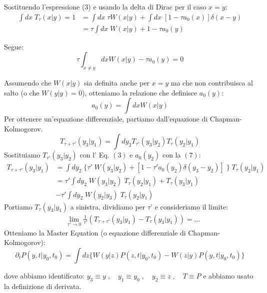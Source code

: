 Sostituendo l'espressione (3) e usando la delta di Dirac per il caso $x=y$:
\begin{align}
\int dx \;T_{\tau}(x|y) = 1 &= \int dx \; \tau W(x|y) + \int dx \; [ 1 - \tau a_0(x) ] \delta(x-y) \nonumber \\ &= \tau  \int dx \; W(x|y) + 1 - \tau a_0(y)
\end{align}

Segue:
\begin{equation}
\tau \int_{x \neq y} dx W(x|y)  - \tau a_0(y) = 0
\end{equation}


Assumendo che $W(x|y)$ sia definita anche per $x=y$ ma che non contribuisca al salto (o che $W(y|y)=0$), otteniamo la relazione che definisce $a_0(y)$:
\begin{equation}
a_0(y) = \int dx W(x|y)  
\end{equation}
Per ottenere un'equazione differenziale, partiamo dall'equazione di Chapman-Kolmogorov. 
\begin{equation}
T_{\tau+ \tau'}(y_3|y_1) = \int dy_2 T_{ \tau'}(y_3|y_2) T_{ \tau}(y_2|y_1)  
\end{equation}
Sostituiamo $T_{ \tau'}(y_3|y_2)$ con l’ Eq. $(3)$ e $a_0(y_2)$ con la $(7)$:
\begin{align*}
T_{\tau+ \tau'}(y_3|y_1) &= \int dy_2 \; \{ \tau'   \; W(y_3|y_2) + \left[1 - \tau' a_0(y_2) \delta(y_3 -y_2) \right] \;  \} \;T_{ \tau}(y_2|y_1)  \nonumber \\ &= \tau' \int dy_2 \;  W(y_3|y_2) \; T_{ \tau}(y_2|y_1)  + T_{ \tau}(y_3|y_1) \nonumber \\   &- \tau' \int dy_2 \; W(y_2|y_3)   \; T_{ \tau}(y_2|y_1) 
\end{align*}
Portiamo $T_{ \tau}(y_3|y_1)$ a sinistra, dividiamo per $\tau’$ e consideriamo il limite:
\begin{align}
&\lim_{\tau' \to 0} \frac{1}{\tau'} \left( T_{\tau+ \tau'}(y_3|y_1) - T_{ \tau}(y_3|y_1) \right) = \dots
\end{align}
Otteniamo la Master Equation (o equazione differenziale di Chapman-Kolmogorov):
\begin{equation}
\partial_t P(y,t|y_0,t_0) = \int dz \{ W(y|z)P(z,t|y_0,t_0) - W(z|y)P(y,t|y_0,t_0) \} 
\end{equation}

dove abbiamo identificato:    $y_3 \equiv y \; , \quad  y_1 \equiv y_0 \; , \quad y_2 \equiv z \; , \quad T \equiv P$    e abbiamo usato la definizione di derivata.


